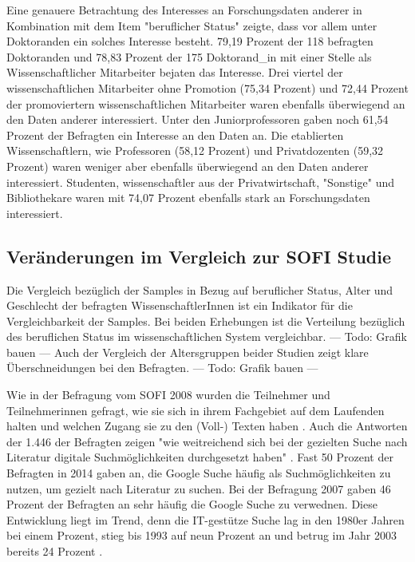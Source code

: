 Eine genauere Betrachtung des Interesses an Forschungsdaten anderer in Kombination mit dem Item "beruflicher Status" zeigte, dass vor allem unter Doktoranden ein solches Interesse besteht. 79,19 Prozent der 118 befragten Doktoranden und 78,83 Prozent der 175 Doktorand_in mit einer Stelle als Wissenschaftlicher Mitarbeiter bejaten das Interesse. Drei viertel der wissenschaftlichen Mitarbeiter ohne Promotion (75,34 Prozent) und 72,44 Prozent der promoviertern wissenschaftlichen Mitarbeiter waren ebenfalls überwiegend an den Daten anderer interessiert. Unter den Juniorprofessoren gaben noch 61,54 Prozent der Befragten ein Interesse an den Daten an. Die etablierten Wissenschaftlern, wie Professoren (58,12 Prozent) und Privatdozenten (59,32 Prozent) waren weniger aber ebenfalls überwiegend an den Daten anderer interessiert.  Studenten, wissenschaftler aus der Privatwirtschaft, "Sonstige" und Bibliothekare waren mit 74,07 Prozent ebenfalls stark an Forschungsdaten interessiert.


\subsection{Veränderungen im Vergleich zur SOFI Studie}

Die Vergleich bezüglich der Samples in Bezug auf beruflicher Status, Alter und Geschlecht der befragten WissenschaftlerInnen ist ein Indikator für die Vergleichbarkeit der Samples. Bei beiden Erhebungen ist die Verteilung bezüglich des beruflichen Status im wissenschaftlichen System vergleichbar.
--- Todo: Grafik bauen ---
Auch der Vergleich der Altersgruppen beider Studien zeigt klare Überschneidungen bei den Befragten.  --- Todo: Grafik bauen ---

Wie in der Befragung vom SOFI 2008 wurden die Teilnehmer und Teilnehmerinnen gefragt, wie sie sich in ihrem Fachgebiet auf dem Laufenden halten und welchen Zugang sie zu den (Voll-) Texten haben \cite{hanekop_2008}. Auch die Antworten der 1.446 der Befragten zeigen "wie weitreichend sich bei der gezielten Suche nach Literatur digitale Suchmöglichkeiten durchgesetzt haben" \cite{hanekop_2008}. Fast 50 Prozent der Befragten in 2014 gaben an, die Google Suche häufig als Suchmöglichkeiten zu nutzen, um gezielt nach Literatur zu suchen. Bei der Befragung 2007 gaben 46 Prozent der Befragten an sehr häufig die Google Suche zu verwednen. Diese Entwicklung liegt im Trend, denn die IT-gestütze Suche lag in den 1980er Jahren bei einem Prozent, stieg bis 1993 auf neun Prozent an und betrug im Jahr 2003 bereits 24 Prozent \cite{hanekop_2008}.


